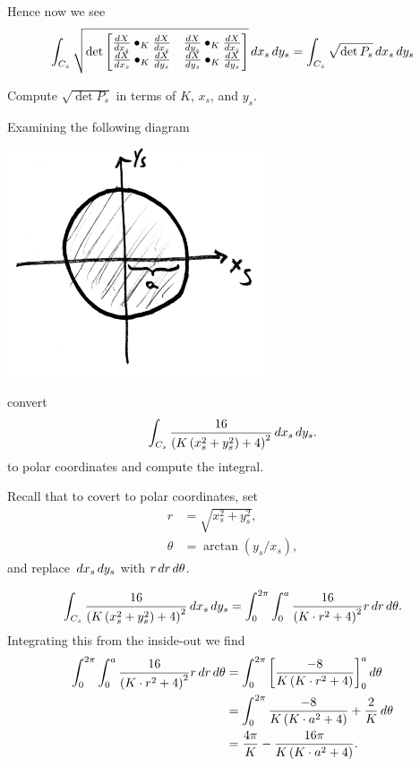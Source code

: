 \documentclass{ximera}
\begin{document}
Hence now we see 
\[
\int_{C_s} \sqrt{
  \det
  \begin{bmatrix}
    \dd[X]{x_s}\bullet_K \dd[X]{x_s} & \dd[X]{y_s}\bullet_K \dd[X]{x_s} \\
    \dd[X]{x_s}\bullet_K \dd[X]{y_s} & \dd[X]{y_s}\bullet_K \dd[X]{y_s}
  \end{bmatrix}
}\d x_s\d y_s = \int_{C_s} \sqrt{\det P_s}\d x_s\d y_s
\]

\begin{problem}
  Compute $\sqrt{\det P_s}$ in terms of $K$, $x_s$, and $y_s$.
\end{problem}


\begin{problem}
  Examining the following diagram
  \begin{image}
    \includegraphics[width=3in]{stereoCirc.png}
  \end{image}
  convert
  \[
  \int_{C_s} \frac{16}{\left(K\left(x_s^2+y_s^2\right)+4\right)^2} \d x_s\d y_s.
  \]
  to polar coordinates and compute the integral.
  \begin{hint}
    Recall that to covert to polar coordinates, set
    \begin{align*}
      r &= \sqrt{x_s^2+y_s^2},\\
      \theta &= \arctan(y_s/x_s),
    \end{align*}
    and replace $\d x_s\d y_s$ with $r\d r\d \theta$.
  \end{hint}
  \begin{freeResponse}
    \[
    \int_{C_s} \frac{16}{\left(K\left(x_s^2+y_s^2\right)+4\right)^2} \d x_s\d y_s
    = \int_0^{2\pi} \int_0^a \frac{16}{\left(K\cdot r^2+4\right)^2} r\d r \d \theta.
    \]
    Integrating this from the inside-out we find
    \begin{align*}
      \int_0^{2\pi} \int_0^a \frac{16}{\left(K\cdot r^2+4\right)^2} r\d r \d \theta
      &= \int_0^{2\pi} \eval{\frac{-8}{K\left(K\cdot r^2+4\right)}}_0^a \d \theta\\
      &= \int_0^{2\pi} \frac{-8}{K\left(K\cdot a^2+4\right)}+\frac{2}{K} \d \theta\\
      &= \frac{4\pi}{K}-\frac{16\pi}{K\left(K\cdot a^2+4\right)}.   
    \end{align*}
  \end{freeResponse}
\end{problem}
\end{document}
